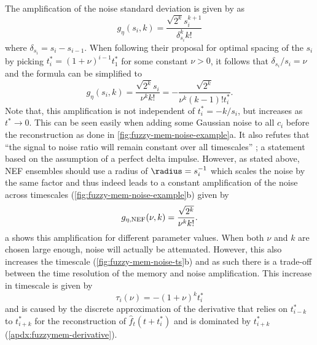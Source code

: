 The amplification of the noise standard deviation is given by \textcite{shankar2013} as
\begin{equation}
    g_{\eta}(s_i, k) = \frac{\sqrt{2^k} s_i^{k+1}}{\delta_{s_i}^k k!}
\end{equation}
where $\delta_{s_i} = s_i - s_{i - 1}$. 
When following their proposal for optimal spacing of the $s_i$ by picking $t_i^* = {(1 + \nu)}^{i - 1} t_1^*$ for some constant $\nu > 0$, it follows that $\delta_{s_i} / s_i = \nu$ and the formula can be simplified to
\begin{equation}
    g_{\eta}(s_i, k) = \frac{\sqrt{2^k} s_i}{\nu^k k!} = - \frac{\sqrt{2^k}}{\nu^k (k-1)! t_i^*} \text{.}
\end{equation}
Note that, this amplification is not independent of $t_i^* = -k/s_i$, but increases as $t^* \rightarrow 0$.
This can be seen easily when adding some Gaussian noise to all $c_i$ before the reconstruction as done in \cref{fig:fuzzy-mem-noise-example}a.
It also refutes that ``the signal to noise ratio will remain constant over all timescales'' \parencite{shankar2013}; a statement based on the assumption of a perfect delta impulse.
However, as stated above, NEF ensembles should use a radius of $\radius = s_i^{-1}$ which scales the noise by the same factor and thus indeed leads to a constant amplification of the noise across timescales (\cref{fig:fuzzy-mem-noise-example}b) given by
\begin{equation}
    g_{\eta,{\mathrm{NEF}}}(\nu, k) = \frac{\sqrt{2^k}}{\nu^k k!} \text{.}
\end{equation}
a shows this amplification for different parameter values.
When both $\nu$ and $k$ are chosen large enough, noise will actually be attenuated.
However, this also increases the timescale (\cref{fig:fuzzy-mem-noise-ts}b) and as such there is a trade-off between the time resolution of the memory and noise amplification.
This increase in timescale is given by
\begin{equation}
    \tau_i(\nu) = - {(1 + \nu)}^k t^*_i \label{eqn:fuzzymem-ts}
\end{equation}
and is caused by the discrete approximation of the derivative that relies on $t^*_{i - k}$ to $t^*_{i + k}$ for the reconstruction of $\hat{f}_t(t + t^*_i)$ and is dominated by $t^*_{i + k}$ (\cref{apdx:fuzzymem-derivative}).
